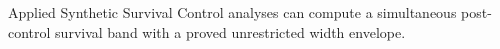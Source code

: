 Applied Synthetic Survival Control analyses can compute a simultaneous post-control survival band with a proved unrestricted width envelope.